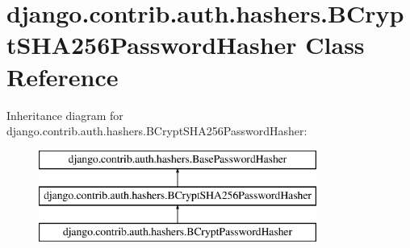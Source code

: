 \hypertarget{classdjango_1_1contrib_1_1auth_1_1hashers_1_1_b_crypt_s_h_a256_password_hasher}{}\section{django.\+contrib.\+auth.\+hashers.\+B\+Crypt\+S\+H\+A256\+Password\+Hasher Class Reference}
\label{classdjango_1_1contrib_1_1auth_1_1hashers_1_1_b_crypt_s_h_a256_password_hasher}
Inheritance diagram for django.\+contrib.\+auth.\+hashers.\+B\+Crypt\+S\+H\+A256\+Password\+Hasher\+:\begin{figure}[H]
\begin{center}
\leavevmode
\includegraphics[height=3.000000cm]{classdjango_1_1contrib_1_1auth_1_1hashers_1_1_b_crypt_s_h_a256_password_hasher}
\end{center}
\end{figure}
